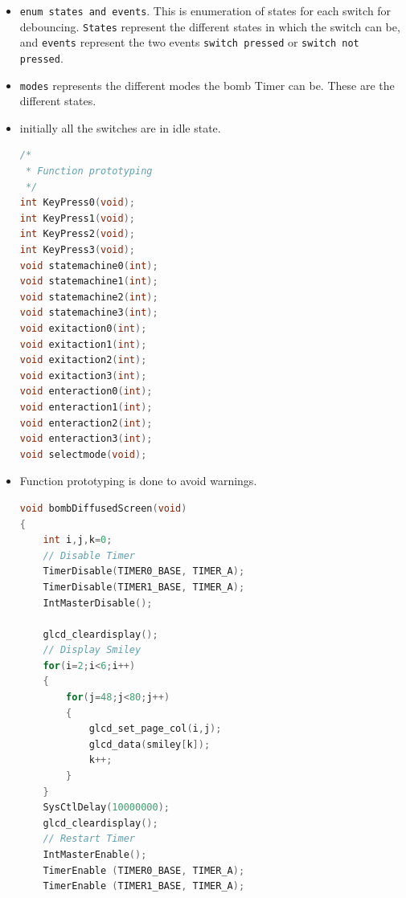 \documentclass{article}
\begin{document}
\begin{itemize}
  \item \texttt{enum states and events}. This is enumeration of states for each switch for debouncing. \texttt{States} represent the different states in which the switch can be, and \texttt{events} represent the two events \texttt{switch pressed} or \texttt{switch not pressed}.
  \item \texttt{modes} represents the different modes the bomb Timer can be. These are the different states.
  \item initially all the switches are in idle state.
      \begin{lstlisting}[basicstyle = \small, language = C]
/*
 * Function prototyping
 */
int KeyPress0(void);
int KeyPress1(void);
int KeyPress2(void);
int KeyPress3(void);
void statemachine0(int);
void statemachine1(int);
void statemachine2(int);
void statemachine3(int);
void exitaction0(int);
void exitaction1(int);
void exitaction2(int);
void exitaction3(int);
void enteraction0(int);
void enteraction1(int);
void enteraction2(int);
void enteraction3(int);
void selectmode(void);
  \end{lstlisting}
  \item Function prototyping is done to avoid warnings.
      \begin{lstlisting}[basicstyle = \small, language = C]
void bombDiffusedScreen(void)
{
    int i,j,k=0;
    // Disable Timer
    TimerDisable(TIMER0_BASE, TIMER_A);
    TimerDisable(TIMER1_BASE, TIMER_A);
    IntMasterDisable();

    glcd_cleardisplay();
    // Display Smiley
    for(i=2;i<6;i++)
    {
        for(j=48;j<80;j++)
        {
            glcd_set_page_col(i,j);
            glcd_data(smiley[k]);
            k++;
        }
    }
    SysCtlDelay(10000000);
    glcd_cleardisplay();
    // Restart Timer
    IntMasterEnable();
    TimerEnable (TIMER0_BASE, TIMER_A);
    TimerEnable (TIMER1_BASE, TIMER_A);


\end{lstlisting}
\end{itemize}
\end{document}
